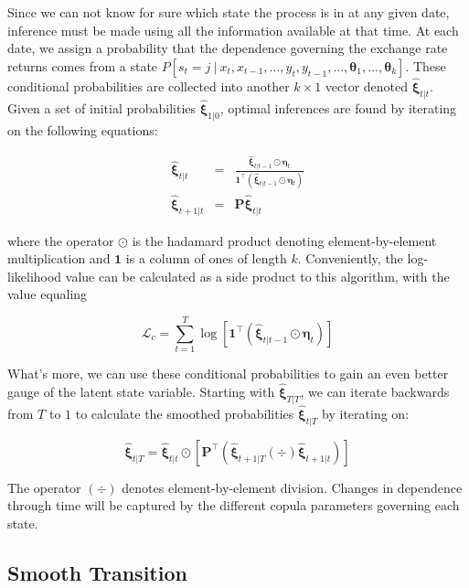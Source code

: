 \documentclass[12pt]{article}
\newcommand{\Lagr}{\mathcal{L}}
\newcommand{\boldXi}{\hat{\boldsymbol{\xi}}}
\begin{document}
Since we can not know for sure which state the process is in at any given date, inference must be made using all the information available at that time. At each date, we assign a probability that the dependence governing the exchange rate returns comes from a state $P\left[s_{t}=j~|~x_{t},x_{t-1},...,y_{t},y_{t-1},...,\mathbf{\theta}_{1},...,\mathbf{\theta}_{k}\right]$. These conditional probabilities are collected into another $k\times 1$ vector denoted $\boldXi_{t|t}$. Given a set of initial probabilities $\boldXi_{1|0}$, optimal inferences are found by iterating on the following equations:

\begin{eqnarray}
	\boldXi_{t|t} &=& \frac{\boldXi_{t|t-1}\odot\boldsymbol{\eta}_{t}}{\mathbf{1}^{\top}\left(\boldXi_{t|t-1}\odot \boldsymbol{\eta}_{t}\right)} \\
	\boldXi_{t+1|t} &=& \mathbf{P} \boldXi_{t|t}
\end{eqnarray}

where the operator $\odot$ is the hadamard product denoting element-by-element multiplication and $\mathbf{1}$ is a column of ones of length $k$. Conveniently, the log-likelihood value can be calculated as a side product to this algorithm, with the value equaling

\begin{equation}
\Lagr_{c} = \sum_{t=1}^{T}\log \left[\mathbf{1}^{\top}\left(\boldXi_{t|t-1} \odot \boldsymbol{\eta}_{t}\right)\right] 
\end{equation}

What's more, we can use these conditional probabilities to gain an even better gauge of the latent state variable. Starting with $\boldXi_{T|T}$, we can iterate backwards from $T$ to $1$ to calculate the smoothed probabilities $\boldXi_{t|T}$ by iterating on:

\begin{equation} \label{eqn:Kim_smooth_probability}
	\boldXi_{t|T} = \boldXi_{t|t} \odot \left[\mathbf{P}^{\top}\left(\boldXi_{t+1|T}\left(\div\right)\boldXi_{t+1|t}\right)\right]
\end{equation}

The operator $\left(\div\right)$ denotes element-by-element division. Changes in dependence through time will be captured by the different copula parameters governing each state.

\subsection{Smooth Transition}
\end{document}
